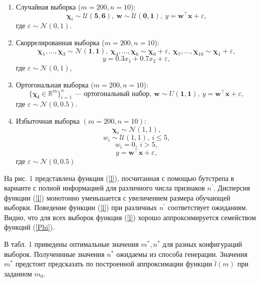 \documentclass[12pt, a4paper]{scrartcl}
\theoremstyle{plain}
\theoremstyle{definition}
\begin{document}
\begin{enumerate}
	\item Случайная выборка ($m = 200, n = 10$): 
$$ 
\boldsymbol{\chi}_i \sim \mathcal{U}(\mathbf{5}, \mathbf{6}), ~ \mathbf{w} \sim \mathcal{U}(\mathbf{0}, \mathbf{1}), ~ y = \mathbf{w}^{\top}\mathbf{x} + \varepsilon,
$$
где $\varepsilon \sim \mathcal{N}(0, 1)$.
	\item Скоррелированная выборка ($m = 200, n = 10$):
$$
\boldsymbol{\chi}_1, ..., \boldsymbol{\chi}_3 \sim \mathcal{N}(\mathbf{1}, \mathbf{1}),~ \boldsymbol{\chi}_4, ..., \boldsymbol{\chi}_6 \sim \boldsymbol{\chi}_0 + \varepsilon, ~\boldsymbol{\chi}_7, ..., \boldsymbol{\chi}_{10} \sim \boldsymbol{\chi}_1 + \varepsilon,
$$
$$
	y = 0.3x_1 + 0.7x_2 + \varepsilon,
$$
где $\varepsilon \sim \mathcal{N}(0, 1)$,
	\item Ортогональная выборка ($m = 200, n = 10$):
$$
	\{\boldsymbol{\chi_i} \in \mathbb{R}^{m}\}_{i=1}^{n}  \text{ --- ортогональный набор}, ~\mathbf{w} \sim U(\mathbf{1}, \mathbf{1}), ~y = \mathbf{w}^{\top}\mathbf{x} + \varepsilon,
$$
где $\varepsilon \sim \mathcal{N}(0, 0.5)$.
	\item Избыточная выборка $(m=200, n=10)$:
$$
	\boldsymbol{\chi}_i \sim \mathcal{N}(1, 1), 
$$
$$
	w_i \sim \mathcal{U}(1, 1), ~i \leq 5, 
$$
$$
	w_i = 0, ~i > 5,
$$
$$
	y = \mathbf{w}^{\top}\mathbf{x} + \varepsilon,
$$
где $\varepsilon \sim \mathcal{N}(0, 0.5)$
\end{enumerate}

На рис. 1 представлена функция (\ref{l}), посчитанная  с помощью бутстрепа в варианте с полной информацией для различного числа признаков $n^{\prime}$. Дисперсия функции (\ref{l}) монотонно уменьшается с увеличением размера обучающей выборки. Поведение функции (\ref{l}) при различных $n^{\prime}$ соответствует ожиданиям. Видно, что для всех выборок функция (\ref{l}) хорошо аппроксимируется семейством функций (\ref{Phi}).

В табл. 1 приведены оптимальные значения $m^*, n^*$ для разных конфигураций выборок. Полученнные значения $n^*$ ожидаемы  из способа генерации. Значения $m^*$ предстоит предсказать по построенной аппроксимации функции $\hat{l}(m)$ при заданном $m_0$.
\end{document}
